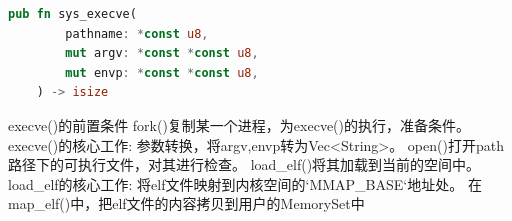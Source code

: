 \begin{lstlisting}[language=rust,caption={execve}]
    pub fn sys_execve(
        pathname: *const u8,
        mut argv: *const *const u8,
        mut envp: *const *const u8,
    ) -> isize
\end{lstlisting}
execve()的前置条件
fork()复制某一个进程，为execve()的执行，准备条件。
execve()的核心工作:
参数转换，将argv,envp转为Vec<String>。
open()打开path路径下的可执行文件，对其进行检查。
load_elf()将其加载到当前的空间中。
load_elf的核心工作:
将elf文件映射到内核空间的`MMAP_BASE`地址处。
在map_elf()中，把elf文件的内容拷贝到用户的MemorySet中
